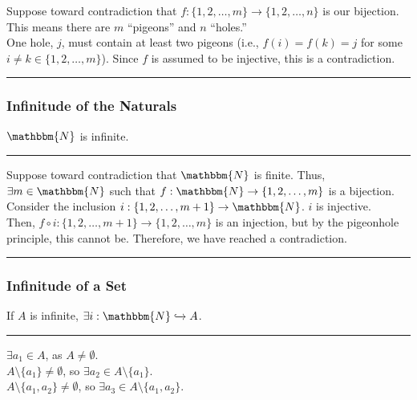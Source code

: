 \documentclass[10pt]{extarticle}
\begin{document}
      Suppose toward contradiction that $f: \{1,2,\dots,m\} \rightarrow \{1,2,\dots,n\}$ is our bijection. This means there are $m$ ``pigeons'' and $n$ ``holes.''\\

      One hole, $j$, must contain at least two pigeons (i.e., $f(i) = f(k) = j$ for some $i\neq k\in \{1,2,\dots,m\}$). Since $f$ is assumed to be injective, this is a contradiction.\\
      \vspace{4pt}
      \rule{\textwidth}{0.4pt}
      \subsubsection{Infinitude of the Naturals}%
      $\mathbbm{N}$ is infinite.\\
      \vspace{4pt}
      \rule{\textwidth}{0.4pt}
      \vspace{4pt}
      
      Suppose toward contradiction that $\mathbbm{N}$ is finite. Thus, $\exists m\in \mathbbm{N}$ such that $f:\mathbbm{N} \rightarrow \{1,2,\dots,m\}$ is a bijection.\\

      Consider the inclusion $i: \{1,2,\dots,m+1\}\rightarrow \mathbbm{N}$. $i$ is injective.\\

      Then, $f\circ i: \{1,2,\dots,m+1\} \rightarrow \{1,2,\dots,m\}$ is an injection, but by the pigeonhole principle, this cannot be. Therefore, we have reached a contradiction.\\
      \vspace{4pt}
      \rule{\textwidth}{0.4pt}
      \subsubsection{Infinitude of a Set}%
      If $A$ is infinite, $\exists i: \mathbbm{N} \xhookrightarrow{} A$.\\
      \vspace{4pt}
      \rule{\textwidth}{0.4pt}
      \vspace{4pt}
      $\exists a_1\in A$, as $A\neq \emptyset$.\\

      $A\setminus \{a_1\} \neq \emptyset$, so $\exists a_2 \in A\setminus \{a_1\}$.\\

      $A \setminus \{a_1,a_2\} \neq \emptyset$, so $\exists a_3\in A\setminus \{a_1,a_2\}$.\\
\end{document}
